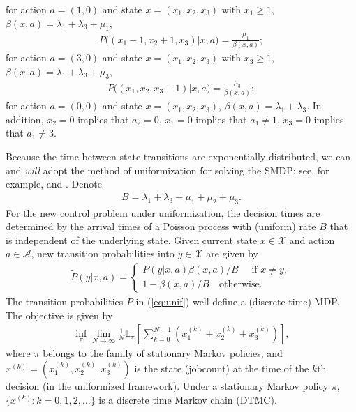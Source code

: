 \documentclass[11pt]{article}
\newcommand{\E}{\mathbb{E}}
\newcommand{\X}{\mathcal{X}}
\newcommand{\A}{\mathcal{A}}
\theoremstyle{definition}
\numberwithin{equation}{section}
\begin{document}
for action $a=(1,0)$ and state $x=(x_1, x_2, x_3)$ with $x_1\ge 1$, $\beta(x,a)=\lambda_1+\lambda_3+\mu_1$,
\begin{align*}
   P\big((x_1-1, x_2+1, x_3)|x,a\big)=\frac{\mu_1}{\beta(x,a)};
\end{align*}
for action $a=(3,0)$ and state $x=(x_1, x_2, x_3)$ with $x_3\ge 1$, $\beta(x,a)=\lambda_1+\lambda_3+\mu_3$,
\begin{align*}
  P\big((x_1, x_2, x_3-1)|x,a\big)=\frac{\mu_3}{\beta(x,a)};
\end{align*}
for action $a=(0,0)$ and state $x=(x_1, x_2, x_3)$,
$\beta(x,a)=\lambda_1+\lambda_3$. In addition, $x_2=0$ implies that
$a_2=0$, $x_1=0$ implies that $a_1\neq 1$, $x_3=0$ implies that $a_1\neq 3$.


Because the time between state transitions are exponentially
distributed, we can and \emph{will} adopt the method of uniformization for solving the SMDP;
see, for example,  \cite{Serfozo1979} and \cite[Chapter 11]{Puterman2005}.
Denote
\begin{align}
  \label{eq:B}
B=\lambda_1+\lambda_3+\mu_1+\mu_2+\mu_3.
\end{align}
 For the new control
problem under uniformization, the decision times are determined by the
arrival times of a Poisson process with (uniform) rate $B$ that is independent of the underlying state. Given current state $x\in \X$
and action $a\in \A$, new transition probabilities into $y\in \X$ are given by
\begin{align}\label{eq:unif}
\tilde P(y|x, a) =
\begin{cases}
P(y|x, a) \beta(x, a) / B \quad \text{ if } x\neq y,\\
1 - \beta(x, a) / B  \quad \text{otherwise.}
\end{cases}
\end{align}
The transition probabilities $\tilde P$ in (\ref{eq:unif}) well define
a (discrete time) MDP. The  objective is given by
\begin{align}\label{eq:co1}
\inf\limits_{\pi} \lim\limits_{N\rightarrow \infty}\frac{1}{N}\E_{\pi}\left[ \sum\limits_{k=0}^{N-1}\left(x_1^{(k)}+x_2^{(k)}+x_3^{(k)}\right)\right],
\end{align}
where $\pi$ belongs to the family of stationary Markov policies,
and $x^{(k)} = \left(x_1^{(k)}, x_2^{(k)}, x_3^{(k)}\right)$ is the state (jobcount)
at the time of the $k$th decision (in the uniformized framework).
Under a stationary Markov policy $\pi$, $\{x^{(k)}:k=0, 1, 2, \ldots\}$ is a discrete time Markov chain (DTMC).
\end{document}
